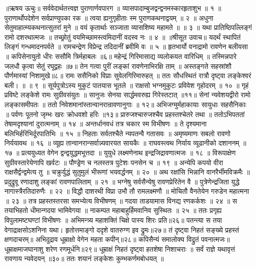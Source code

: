 ॥ऋषय ऊचुः॥
सर्ववेदार्थतत्त्वज्ञ पुराणार्णवपारग ॥
व्यासपादाम्बुजद्वन्द्वनमस्कारहृताशुभ ॥ १ ॥
पुराणार्थोपदेशेन सर्वप्राण्युपका रक ॥
त्वया ह्यनुगृहीताः स्म पुराणकथनाद्वयम् ॥ २ ॥
अधुना सेतुमाहात्म्यकथनात्सुतरां मुने ॥
वयं कृतार्थाः सञ्जाता व्यासशिष्य महामते ॥ ॥ ३ ॥
यथा प्रातिष्ठिपल्लिङ्गं रामो दशरथात्मजः ॥
तच्छ्रोतुं वयमिच्छामस्त्वमिदानीं वदस्व नः ॥ ४ ॥
॥श्रीसूत उवाच॥
यदर्थं स्थापितं लिङ्गं गन्धमादनपर्वते ॥
रामचन्द्रेण विप्रेन्द्र तदिदानीं ब्रवीमि वः ॥ ५ ॥
हृतभार्यो वनाद्रामो रावणेन बलीयसा ॥
कपिसेनायुतो धीरः ससौमि त्रिर्महाबलः ॥६॥
महेन्द्रं गिरिमासाद्य व्यलोकयत वारिधिम् ॥
तस्मिन्नपारे जलधौ कृत्वा सेतुं रघूद्वहः ॥७॥
तेन गत्वा पुरीं लङ्कां रावणेनाभिरक्षि ताम् ॥
अस्तङ्गते सहस्रांशौ पौर्णमास्यां निशामुखे॥८॥
रामः ससैनिको विप्राः सुवेलगिरिमारुहत् ॥
ततः सौधस्थितं रात्रौ दृष्ट्वा लङ्केश्वरं बली। ॥ ॥ ९ ॥
सूर्यपुत्रोऽस्य मुकुटं पातयास भूतले ॥
राक्षसो भग्नमुकुटः प्रविवेश गृहोदरम् ॥ १० ॥
गृहं प्रविष्टे लङ्केशे रामः सुग्रीवसंयुतः ॥
सानुजः सेनया सार्द्धमवरुह्य गिरेस्तटात् ॥११॥
सेनां न्यवेशयद्वीरो रामो लङ्कासमीपतः ॥
ततो निवेशमानांस्तान्वानरान्रावणानुगाः ॥ १२॥
अभिजग्मुर्महाकायाः सायुधाः सहसैनिकाः ॥
पर्वणः पूतनो जृम्भः खरः क्रोधवशो हरिः ॥१३॥
प्रारुजश्चारुजश्चैव प्रहस्तश्चेतरे तथा ॥
ततोऽभिपततां तेषामदृश्यानां दुरात्मनाम् ॥ १४ ॥
अन्तर्धानवधं तत्र चकार स्म विभीषणः ॥
ते दृश्यमाना बलिभिर्हरिभिर्दूरपातिभिः ॥ १५ ॥
निहताः सर्वतश्चैते न्यपतन्वै गतासवः ॥
अमृष्यमाणः सबलो रावणो निर्ययावथ ॥ १६ ॥
व्यूह्य तान्वानरान्सर्वान्न्यवारयत सायकैः ॥
राघवस्त्वथ निर्याय व्यूढानीको दशाननम् ॥ १७ ॥
प्रत्ययुध्यत वेगेन द्वन्द्वयुद्धमभूत्तदा ॥
युयुधे लक्ष्मणेनाथ इन्द्रजिद्रावणात्मजः ॥ १८ ॥
विरूपाक्षेण सुग्रीवस्तारेयेणापि खर्वटः ॥
पौण्ड्रेण च नलस्तत्र पुटेशः पनसेन च ॥ १९ ॥
अन्येपि कपयो वीरा राक्षसैर्द्वन्द्वमेत्य तु ॥
चक्रुर्युद्धं सुतुमुलं भीरूणां भयवर्द्धनम् ॥ २० ॥
अथ रक्षांसि भिन्नानि वानरैर्भीमविक्रमैः ॥
प्रदुद्रुवू रणादाशु लङ्कां रावणपालिताम् ॥ २१ ॥
भग्नेषु सर्वसैन्येषु रावणप्रेरितेन वै ॥
पुत्रेणेन्द्रजिता युद्धे नागास्त्रैरतिदारुणैः ॥ २२ ॥
विद्धौ दाशरथी विप्रा उभौ तौ रामलक्ष्मणौ ॥
मोचितौ वैनतेयेन गरुडेन महात्मना ॥ २३ ॥
तत्र प्रहस्तस्तरसा समभ्येत्य विभीषणम् ॥
गदया ताडयामास विनद्य रणकर्कशः ॥ २४ ॥
स तयाभिहतो धीमान्गदया भामिवेगया ॥
नाकम्पत महाबाहुर्हिमवानिव सुस्थितः ॥ २५ ॥
ततः प्रगृह्य विपुलामष्टघण्टां विभीषणः ॥
अभिमन्त्र्य महाशक्तिं चिक्षे पास्य शिरः प्रति॥२६॥
पतन्त्या स तया वेगाद्राक्षसोऽशनिना यथा।
हृतोत्तमाङ्गो ददृशे वातरुग्ण इव द्रुमः॥२७॥
तं दृष्ट्वा निहतं सङ्ख्ये प्रहस्तं क्षणदाचरम्॥
अभिदुद्राव धूम्राक्षो वेगेन महता कपीन्॥२८॥
कपिसैन्यं समालोक्य विद्रुतं पवनात्मजः॥
धूम्राक्षमाजघानाशु शरेण रणमूर्धनि॥२९॥
धूम्राक्षं निहतं दृष्ट्वा हतशेषा निशाचराः ॥
सर्वं राज्ञे यथावृत्तं रावणाय न्यवेदयन् ॥३०॥
ततः शयानं लङ्केशः कुम्भकर्णमबोधयत् ॥
